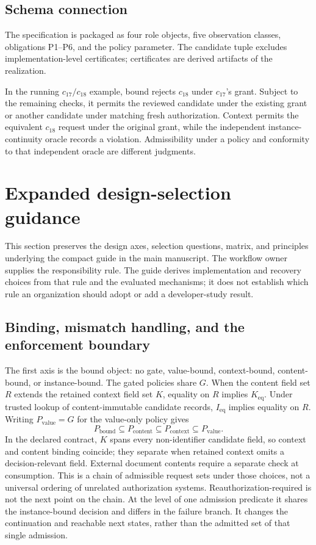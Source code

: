 \subsection{Schema connection}
The specification is packaged as four role objects, five observation classes, obligations P1--P6, and the policy parameter. The candidate tuple excludes implementation-level certificates; certificates are derived artifacts of the realization.

In the running $c_{17}/c_{18}$ example, bound rejects $c_{18}$ under $c_{17}$'s grant. Subject to the remaining checks, it permits the reviewed candidate under the existing grant or another candidate under matching fresh authorization. Context permits the equivalent $c_{18}$ request under the original grant, while the independent instance-continuity oracle records a violation. Admissibility under a policy and conformity to that independent oracle are different judgments.

\section{Expanded design-selection guidance}
\label{app:design-guidance}
This section preserves the design axes, selection questions, matrix, and principles underlying the compact guide in the main manuscript. The workflow owner supplies the responsibility rule. The guide derives implementation and recovery choices from that rule and the evaluated mechanisms; it does not establish which rule an organization should adopt or add a developer-study result.

\subsection{Binding, mismatch handling, and the enforcement boundary}
The first axis is the bound object: no gate, value-bound, context-bound, content-bound, or instance-bound. The gated policies share $G$. When the content field set $R$ extends the retained context field set $K$, equality on $R$ implies $K_{\mathrm{eq}}$. Under trusted lookup of content-immutable candidate records, $I_{\mathrm{eq}}$ implies equality on $R$. Writing $P_{\mathrm{value}}=G$ for the value-only policy gives
\[
 P_{\mathrm{bound}}\subseteq P_{\mathrm{content}}\subseteq P_{\mathrm{context}}\subseteq P_{\mathrm{value}}.
\]
In the declared contract, $K$ spans every non-identifier candidate field, so context and content binding coincide; they separate when retained context omits a decision-relevant field. External document contents require a separate check at consumption. This is a chain of admissible request sets under those choices, not a universal ordering of unrelated authorization systems. Reauthorization-required is not the next point on the chain. At the level of one admission predicate it shares the instance-bound decision and differs in the failure branch. It changes the continuation and reachable next states, rather than the admitted set of that single admission.

